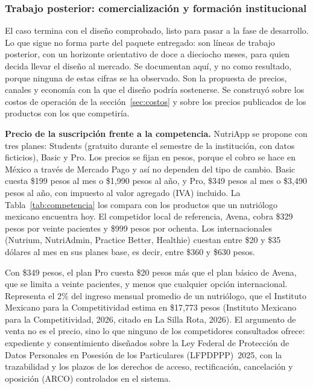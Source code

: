 \documentclass[12pt, a4paper]{article}
\begin{document}
\subsubsection{Trabajo posterior: comercialización y formación institucional}
 
El caso termina con el diseño comprobado, listo para pasar a la fase de
desarrollo. Lo que sigue no forma parte del paquete entregado: son
líneas de trabajo posterior, con un horizonte orientativo de doce a
dieciocho meses, para quien decida llevar el diseño al mercado. Se
documentan aquí, y no como resultado, porque ninguna de estas cifras se
ha observado. Son la propuesta de precios, canales y economía con la que
el diseño podría sostenerse. Se construyó sobre los costos de operación
de la sección~\ref{sec:costos} y sobre los precios publicados de los
productos con los que competiría.
 
\textbf{Precio de la suscripción frente a la competencia.} NutriApp se
propone con tres planes: Students (gratuito durante el semestre de la
institución, con datos ficticios), Basic y Pro. Los precios se fijan en
pesos, porque el cobro se hace en México a través de Mercado Pago y así
no dependen del tipo de cambio. Basic cuesta \$199 pesos al mes o
\$1,990 pesos al año, y Pro, \$349 pesos al mes o \$3,490 pesos al año,
con impuesto al valor agregado (IVA) incluido. La
Tabla~\ref{tab:competencia} los compara con los productos que un
nutriólogo mexicano encuentra hoy. El competidor local de referencia,
Avena, cobra \$329 pesos por veinte pacientes y \$999 pesos por ochenta.
Los internacionales (Nutrium, NutriAdmin, Practice Better, Healthie)
cuestan entre \$20 y \$35 dólares al mes en sus planes base, es decir,
entre \$360 y \$630 pesos.

Con \$349 pesos, el plan Pro cuesta \$20 pesos más que el plan básico de
Avena, que se limita a veinte pacientes, y menos que cualquier opción
internacional. Representa el 2\% del ingreso mensual promedio de un
nutriólogo, que el Instituto Mexicano para la Competitividad estima en
\$17,773 pesos (Instituto Mexicano para la Competitividad, 2026, citado
en La Silla Rota, 2026). El argumento de venta no es el precio, sino lo
que ninguno de los competidores consultados ofrece: expediente y
consentimiento diseñados sobre la Ley Federal de Protección de Datos
Personales en Posesión de los Particulares (LFPDPPP)~2025, con la
trazabilidad y los plazos de los derechos de acceso, rectificación,
cancelación y oposición (ARCO) controlados en el sistema.
 
\end{document}
